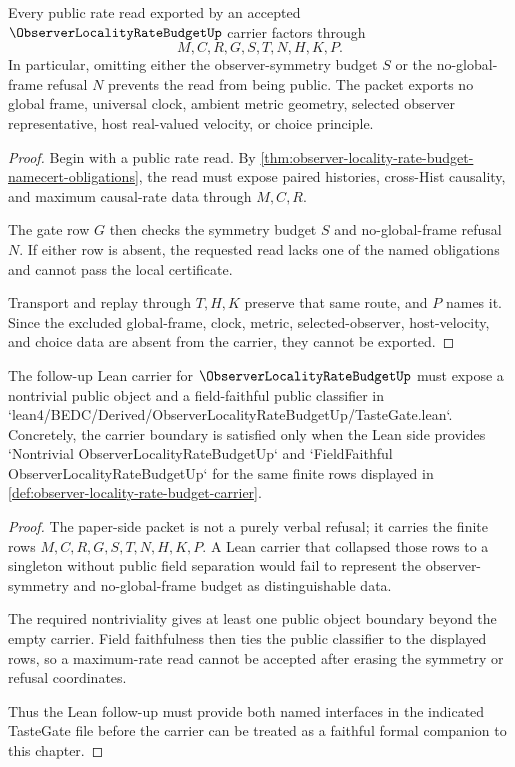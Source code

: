 \begin{theorem}
\label{thm:observer-locality-rate-budget-nonescape}
Every public rate read exported by an accepted $\ObserverLocalityRateBudgetUp$ carrier factors through
$$
M,C,R,G,S,T,N,H,K,P .
$$
In particular, omitting either the observer-symmetry budget $S$ or the no-global-frame refusal $N$ prevents the read from being public. The packet exports no global frame, universal clock, ambient metric geometry, selected observer representative, host real-valued velocity, or choice principle.
\end{theorem}
\begin{proof}
Begin with a public rate read. By \autoref{thm:observer-locality-rate-budget-namecert-obligations}, the read must expose paired histories, cross-Hist causality, and maximum causal-rate data through $M,C,R$.

The gate row $G$ then checks the symmetry budget $S$ and no-global-frame refusal $N$. If either row is absent, the requested read lacks one of the named obligations and cannot pass the local certificate.

Transport and replay through $T,H,K$ preserve that same route, and $P$ names it. Since the excluded global-frame, clock, metric, selected-observer, host-velocity, and choice data are absent from the carrier, they cannot be exported.
\end{proof}

\begin{theorem}
\label{thm:observer-locality-rate-budget-lean-carrier-boundary}
The follow-up Lean carrier for $\ObserverLocalityRateBudgetUp$ must expose a nontrivial public object and a field-faithful public classifier in `lean4/BEDC/Derived/ObserverLocalityRateBudgetUp/TasteGate.lean`. Concretely, the carrier boundary is satisfied only when the Lean side provides `Nontrivial ObserverLocalityRateBudgetUp` and `FieldFaithful ObserverLocalityRateBudgetUp` for the same finite rows displayed in \autoref{def:observer-locality-rate-budget-carrier}.
\end{theorem}
\begin{proof}
The paper-side packet is not a purely verbal refusal; it carries the finite rows $M,C,R,G,S,T,N,H,K,P$. A Lean carrier that collapsed those rows to a singleton without public field separation would fail to represent the observer-symmetry and no-global-frame budget as distinguishable data.

The required nontriviality gives at least one public object boundary beyond the empty carrier. Field faithfulness then ties the public classifier to the displayed rows, so a maximum-rate read cannot be accepted after erasing the symmetry or refusal coordinates.

Thus the Lean follow-up must provide both named interfaces in the indicated TasteGate file before the carrier can be treated as a faithful formal companion to this chapter.
\end{proof}

